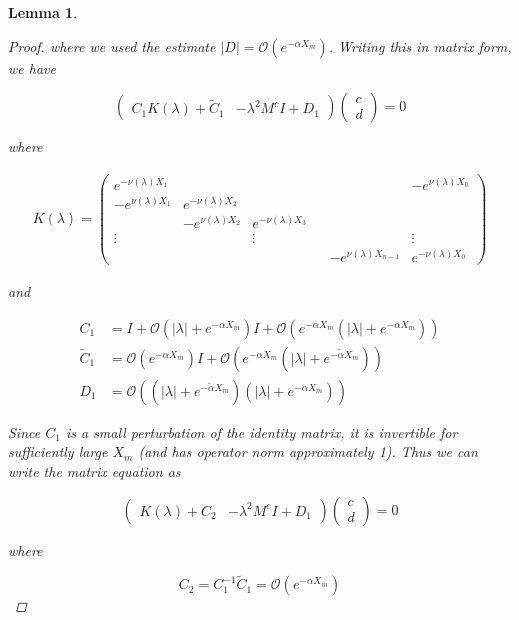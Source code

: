 \documentclass[12pt]{article}
\newtheorem{lemma}{Lemma}
\begin{document}
\begin{lemma}
\begin{proof}
where we used the estimate $|D| = \mathcal{O}(e^{-\alpha X_m})$. Writing this in matrix form, we have

\[
\begin{pmatrix}
C_1 K(\lambda) + \tilde{C}_1 & -\lambda^2 M^c I + D_1
\end{pmatrix}
\begin{pmatrix}
c \\ d
\end{pmatrix} = 0
\]

where

\begin{align*}
K(\lambda) =  
\begin{pmatrix}
e^{-\nu(\lambda)X_1} & & & & & -e^{\nu(\lambda)X_0} \\
-e^{\nu(\lambda)X_1} & e^{-\nu(\lambda)X_2} \\
& -e^{\nu(\lambda)X_2} & e^{-\nu(\lambda)X_3} \\
\vdots & & \vdots & &&  \vdots \\
& & & & -e^{\nu(\lambda)X_{n-1}} & e^{-\nu(\lambda)X_0} 
\end{pmatrix}
\end{align*}

and

\begin{align*}
C_1 &= I + \mathcal{O}(|\lambda| + e^{-\alpha X_m}) I 
+ \mathcal{O}(e^{-\alpha X_m}( |\lambda| + e^{-\alpha X_m}))\\
\tilde{C}_1 &= \mathcal{O}(e^{-\alpha X_m}) I + \mathcal{O}(e^{-\alpha X_m}(|\lambda| + e^{-\tilde{\alpha} X_m})) \\
D_1 &= \mathcal{O}((|\lambda| + e^{-\tilde{\alpha} X_m})(|\lambda| + e^{-\alpha X_m}))
\end{align*}

Since $C_1$ is a small perturbation of the identity matrix, it is invertible for sufficiently large $X_m$ (and has operator norm approximately 1). Thus we can write the matrix equation as

\[
\begin{pmatrix}
K(\lambda) + C_2  & -\lambda^2 M^c I + D_1
\end{pmatrix}
\begin{pmatrix}
c \\ d
\end{pmatrix} = 0
\]

where

\[
C_2 = C_1^{-1} \tilde{C}_1 = \mathcal{O}(e^{-\alpha X_m})
\]

\end{proof}
\end{lemma}
\end{document}
